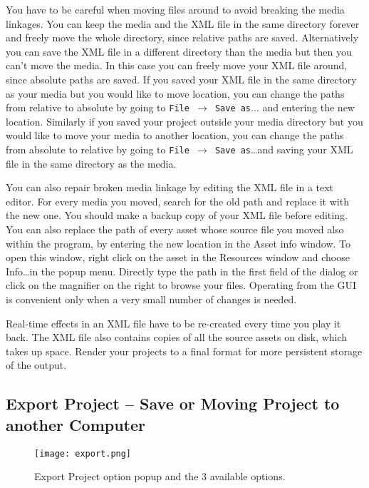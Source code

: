 You have to be careful when moving files around to avoid breaking the media linkages. You can keep the media and the XML file in the same directory forever and freely move the whole directory, since relative paths are saved. Alternatively you can save the XML file in a different directory than the media but then you can't move the media. In this case you can freely move your XML file around, since absolute paths are saved. If you saved your XML file in the same directory as your media but you would like to move location, you can change the paths from relative to absolute by going
to \texttt{File $\rightarrow$ Save as}$\dots$ and entering the new location. Similarly if you saved your project outside your media directory but you would like to move your media to another location, you can change the paths from absolute to relative by going to \texttt{File $\rightarrow$ Save as}\dots and saving your XML file in the same directory as the media.

You can also repair broken media linkage by editing the XML file in a text editor. For every media you moved, search for the old path and replace it with the new one. You should make a backup copy of your XML file before editing. You can also replace the path of every asset whose source file you moved also within the program, by entering the new location in the Asset info window. To open this window, right click on the asset in the Resources window and choose Info\dots in the popup menu. Directly type the path in the first field of the dialog or click on the magnifier on the right to browse your files. Operating
from the GUI is convenient only when a very small number of changes is needed.

Real-time effects in an XML file have to be re-created every time you play it back. The XML file also contains copies of all the source assets on disk, which takes up space.  Render your projects to a final format for more persistent storage of the output.

\subsection{Export Project – Save or Moving Project to another Computer}%
\label{sub:export_project}

\begin{figure}[htpb]
    \centering
    \texttt{[image: export.png]}
    \caption{Export Project option popup and the 3         available options.}
    \label{fig:export}
\end{figure}


